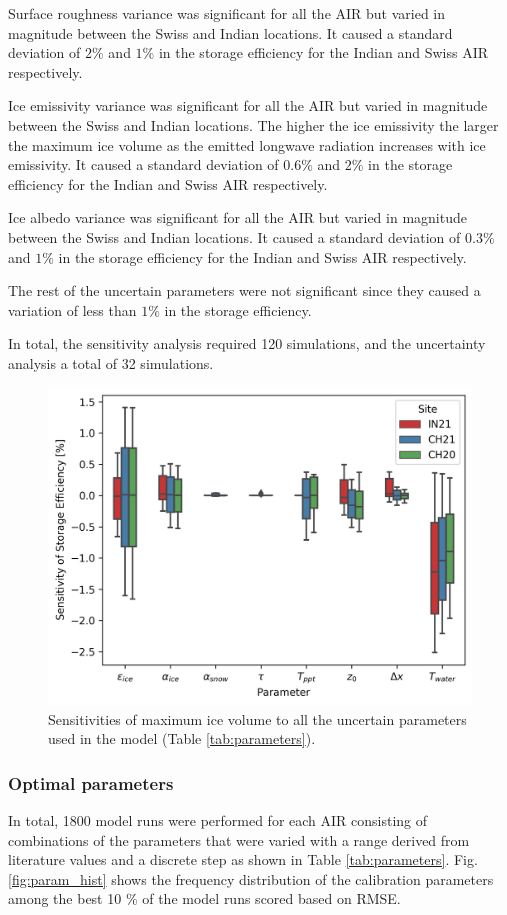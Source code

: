 \documentclass[utf8]{frontiersSCNS} %
\begin{document}
Surface roughness variance was significant for all the AIR but varied in magnitude between the Swiss and Indian
locations. It caused a standard deviation of $2\%$ and $1\%$ in the storage efficiency for the Indian and Swiss AIR
respectively.

Ice emissivity variance was significant for all the AIR but varied in magnitude between the Swiss and Indian
locations. The higher the ice emissivity the larger the maximum ice volume as the emitted longwave radiation increases
with ice emissivity.  It caused a standard deviation of $0.6\%$ and $2\%$ in the storage efficiency for the Indian and
Swiss AIR respectively.

Ice albedo variance was significant for all the AIR but varied in magnitude between the Swiss and Indian locations.
It caused a standard deviation of $0.3\%$ and $1\%$ in the storage efficiency for the Indian and Swiss AIR respectively.

The rest of the uncertain parameters were not significant since they caused a variation of less than $1\%$ in the
storage efficiency.

In total, the sensitivity analysis required 120 simulations, and the uncertainty analysis a total of 32 simulations.

\begin{figure}
	\begin{center}
		\includegraphics[width=10 cm]{Figures/sensitivities.jpg}
	\end{center}
	\caption{Sensitivities of maximum ice volume to all the uncertain parameters used in the model (Table
		\ref{tab:parameters}). } \label{fig:sensitivity} \end{figure}

\subsubsection{Optimal parameters}
In total, 1800 model runs were performed for each AIR consisting of combinations of the parameters that were varied with a range
derived from literature values and a discrete step as shown in Table \ref{tab:parameters}. Fig. \ref{fig:param_hist}
shows the frequency distribution of the calibration parameters among the best 10 \% of the model runs scored based on RMSE.
\end{document}
